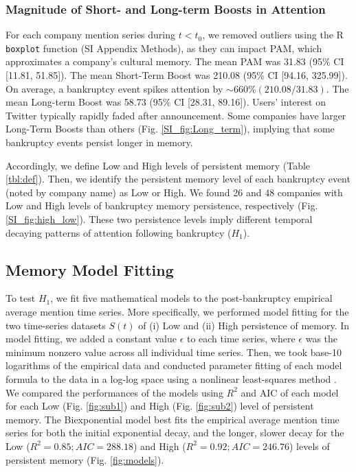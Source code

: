 \documentclass[9pt,twocolumn,twoside,lineno]{pnas-new}
\begin{document}
\subsubsection*{Magnitude of Short- and Long-term Boosts in Attention} 
For each company mention series during $t<t_0$, we removed outliers using the R \texttt{boxplot} function (SI Appendix Methods), as they can impact PAM, which approximates a company's cultural memory.
The mean PAM was 31.83 (95\% CI [11.81, 51.85]).
The mean Short-Term Boost was 210.08 (95\% CI [94.16, 325.99]).
On average, a bankruptcy event spikes attention by $\sim660\% (210.08/31.83)$.
The mean Long-term Boost was 58.73 (95\% CI [28.31, 89.16]).
Users' interest on Twitter typically rapidly faded after announcement.
Some companies have larger Long-Term Boosts than others (Fig. \ref{SI_fig:Long_term}), implying that some bankruptcy events persist longer in memory.

Accordingly, we define Low and High levels of persistent memory (Table \ref{tbl:def}).
Then, we identify the persistent memory level of each bankruptcy event (noted by company name) as Low or High.
We found 26 and 48 companies with Low and High levels of bankruptcy memory persistence, respectively (Fig. \ref{SI_fig:high_low}).
These two persistence levels imply different temporal decaying patterns of attention following bankruptcy ($H_1$).


\subsection*{Memory Model Fitting}
To test $H_1$, we fit five mathematical models to the post-bankruptcy empirical average mention time series.
More specifically, we performed model fitting for the two time-series datasets $S(t)$ of (i) Low and (ii) High persistence of memory.
In model fitting, we added a constant value $\epsilon$ to each time series, where $\epsilon$ was the minimum nonzero value across all individual time series. 
Then, we took base-10 logarithms of the empirical data and conducted parameter fitting of each model formula to the data in a log-log space using a nonlinear least-squares method \cite{west2021postmortem}.
We compared the performances of the models using $R^2$ and AIC of each model for each Low (Fig. \ref{fig:sub1}) and High (Fig. \ref{fig:sub2}) level of persistent memory.
The Biexponential model best fits the empirical average mention time series for both the initial exponential decay, and the longer, slower decay for the Low ($R^2 = 0.85; AIC = 288.18$) and High ($R^2 = 0.92; AIC = 246.76$) levels of persistent memory (Fig. \ref{fig:models}).
\end{document}
